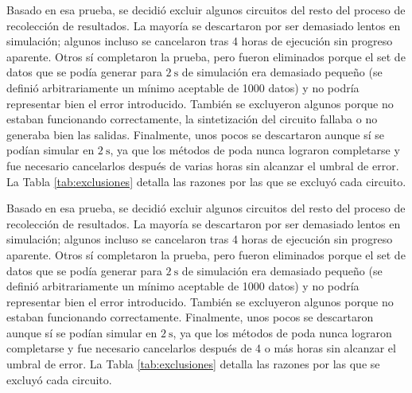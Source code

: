 Basado en esa prueba, se decidió excluir algunos circuitos del resto del
proceso de recolección de resultados. La mayoría se descartaron por ser
demasiado lentos en simulación; algunos incluso se cancelaron tras 4 horas de
ejecución sin progreso aparente. Otros sí completaron la prueba, pero fueron
eliminados porque el set de datos que se podía generar para $\SI{2}{\second}$
de simulación era demasiado pequeño (se definió arbitrariamente un mínimo
aceptable de 1000 datos) y no podría representar bien el error introducido.
También se excluyeron algunos porque no estaban funcionando correctamente, la
sintetización del circuito fallaba o no generaba bien las salidas. Finalmente,
unos pocos se descartaron aunque sí se podían simular en $\SI{2}{\second}$, ya
que los métodos de poda nunca lograron completarse y fue necesario cancelarlos
después de varias horas sin alcanzar el umbral de error. La Tabla
\ref{tab:exclusiones} detalla las razones por las que se excluyó cada circuito.

Basado en esa prueba, se decidió excluir algunos circuitos del resto del
proceso de recolección de resultados. La mayoría se descartaron por ser
demasiado lentos en simulación; algunos incluso se cancelaron tras 4 horas de
ejecución sin progreso aparente. Otros sí completaron la prueba, pero fueron
eliminados porque el set de datos que se podía generar para $\SI{2}{\second}$
de simulación era demasiado pequeño (se definió arbitrariamente un mínimo
aceptable de 1000 datos) y no podría representar bien el error introducido.
También se excluyeron algunos porque no estaban funcionando correctamente.
Finalmente, unos pocos se descartaron aunque sí se podían simular en
$\SI{2}{\second}$, ya que los métodos de poda nunca lograron completarse y fue
necesario cancelarlos después de 4 o más horas sin alcanzar el umbral de error.
La Tabla \ref{tab:exclusiones} detalla las razones por las que se excluyó cada
circuito.

